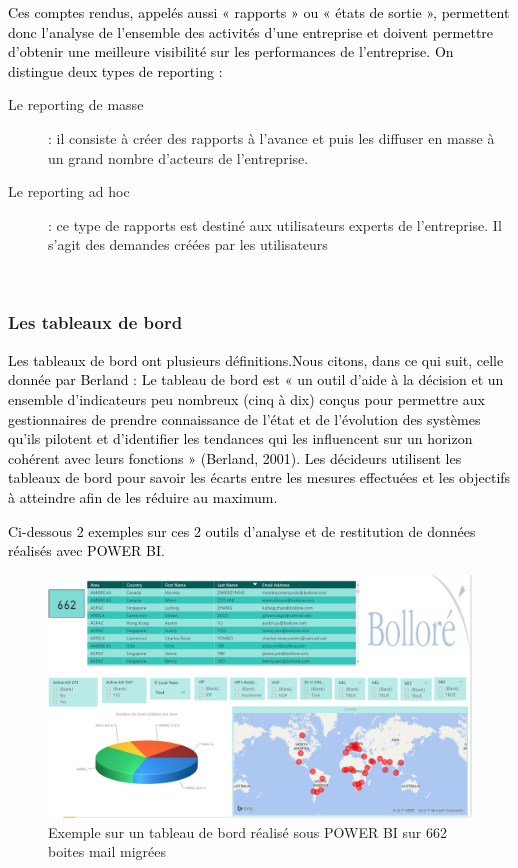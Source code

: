 \documentclass[a4paper,12pt]{report}
\begin{document}
\textcolor{black}{ Ces comptes rendus, appelés aussi « rapports » ou « états de sortie », permettent donc l’analyse de l’ensemble des activités d’une entreprise et doivent permettre d’obtenir une meilleure visibilité sur les performances de l’entreprise. On distingue deux types de reporting :}

\begin{description}
	\item[Le reporting de masse] : il consiste à créer des rapports à l’avance et puis les diffuser en masse à un grand nombre d’acteurs de l’entreprise.
	\item[Le reporting ad hoc] : ce type de rapports est destiné aux utilisateurs experts de l’entreprise.
    Il s’agit des demandes créées par les utilisateurs
\end{description}

~~\\
\subsubsection*{Les tableaux de bord  }

\textcolor{black}{Les tableaux de bord  ont plusieurs définitions.Nous citons, dans ce qui suit, celle donnée par Berland : Le tableau de bord est « un outil d’aide à la décision et un ensemble d’indicateurs peu nombreux (cinq à dix) conçus pour permettre aux gestionnaires de prendre connaissance de l’état et de l’évolution des systèmes qu’ils pilotent et d’identifier les tendances qui les influencent sur un horizon cohérent avec leurs fonctions » (Berland, 2001). Les décideurs utilisent les tableaux de bord pour savoir les écarts entre les mesures effectuées et les objectifs à atteindre afin de les réduire au maximum.}

\textcolor{black}{Ci-dessous 2 exemples sur ces 2 outils d’analyse et de restitution de données réalisés avec POWER BI.}

\begin{figure}[H]
	\begin{center}
		\includegraphics[width=1\linewidth]{Projet_O365/TB}
\end{center}
	\caption{Exemple sur un tableau de bord réalisé sous POWER BI sur 662 boites mail migrées}
	\label{fig:19}	
\end{figure}
\end{document}
